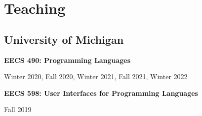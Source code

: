 \documentclass[10pt,letterpaper]{article}
\renewenvironment{itemize}{
  \begin{list}{}{
    \setlength{\leftmargin}{1.25em}
    \setlength{\itemsep}{0.25em}
    \setlength{\parskip}{0pt}
    \setlength{\parsep}{0.2em}
  }
}{
  \end{list}
}
\begin{document}

%


\section*{Teaching}
\subsection*{University of Michigan}
\begin{itemize}
  \item \textbf{EECS 490: Programming Languages} 
    \begin{itemize}
      \item Winter 2020, Fall 2020, Winter 2021, Fall 2021, Winter 2022
    \end{itemize}
  \item \textbf{EECS 598: User Interfaces for Programming Languages}
    \begin{itemize} 
      \item Fall 2019
    \end{itemize}
\end{itemize}
\end{document}
